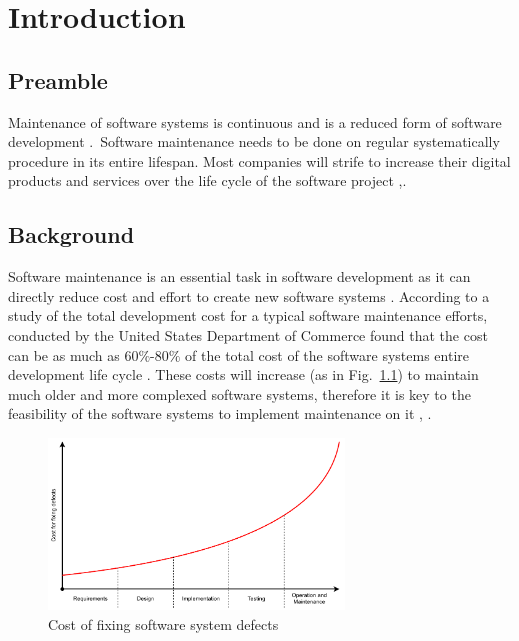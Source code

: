 \chapter{Introduction}
\label{chap:1}

\section{Preamble}
Maintenance of software systems is continuous and is a reduced form of software
development \cite{Sneed2004}.~Software maintenance needs to be done on regular
systematically procedure in its entire lifespan. Most companies will strife to increase their digital products and services over the life cycle of the software project \cite{Niu2018},\cite{Galster2019}.

\section{Background}
Software maintenance is an essential task in software development as it can directly reduce cost and effort to create new software systems \cite{FrancisThamburaj2017}. According to a study of the total development cost for a typical software maintenance efforts, conducted by the United States Department of Commerce found that the cost can be as much as $60\%$-$80\%$ of the total cost of the software systems entire development life cycle \cite{Ogheneovo2014}. These costs will increase (as in Fig.~\ref{fig:CH1_Costs_of_fixing_bugs}) to maintain much older and more complexed software systems, therefore it is key to the feasibility of the software systems to implement maintenance on it \cite{Alenezi2016}, \cite{Booch1986}.

\begin{figure}[!htb] %
    \centering %
    \includegraphics[width=0.7\textwidth]{Images/Chapter1/Background/Cost_of_fixing_bugs/Cost_of_fixing_bugs.pdf}
    \caption{Cost of fixing software system defects \cite{Ogheneovo2014}}\label{fig:CH1_Costs_of_fixing_bugs}
\end{figure} 

